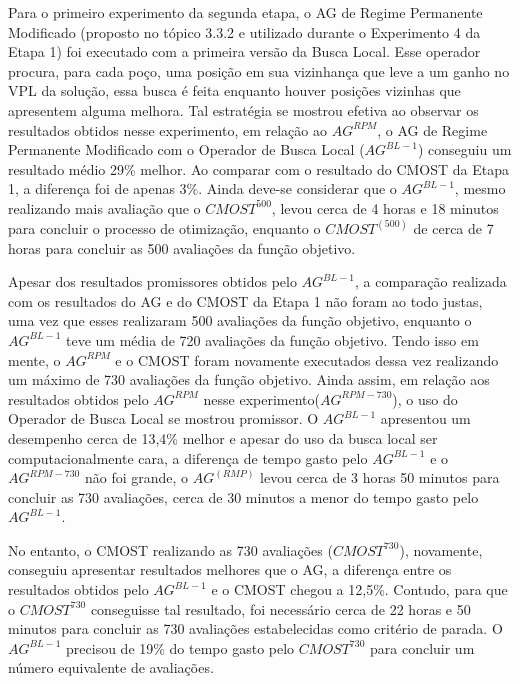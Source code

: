 Para o primeiro experimento da segunda etapa, o AG de Regime Permanente Modificado (proposto no tópico 3.3.2 e utilizado durante o Experimento 4 da Etapa 1) foi executado com a primeira versão da Busca Local. Esse operador procura, para cada poço, uma posição em sua vizinhança que leve a um ganho no VPL da solução, essa busca é feita enquanto houver posições vizinhas que apresentem alguma melhora. Tal estratégia se mostrou efetiva ao observar os resultados obtidos nesse experimento, em relação ao $AG^{RPM}$, o AG de Regime Permanente Modificado com o Operador de Busca Local ($AG^{BL-1}$) conseguiu um resultado médio 29\% melhor. Ao comparar com o resultado do CMOST da Etapa 1, a diferença foi de apenas 3\%. Ainda deve-se considerar que o $AG^{BL-1}$, mesmo realizando mais avaliação que o $CMOST^{500}$, levou cerca de 4 horas e 18 minutos para concluir o processo de otimização, enquanto o $CMOST^(500)$ de cerca de 7 horas para concluir as 500 avaliações da função objetivo.

Apesar dos resultados promissores obtidos pelo $AG^{BL-1}$, a comparação realizada com os resultados do AG e do CMOST da Etapa 1 não foram ao todo justas, uma vez que esses realizaram 500 avaliações da função objetivo, enquanto o $AG^{BL-1}$ teve um média de 720 avaliações da função objetivo. Tendo isso em mente, o $AG^{RPM}$ e o CMOST foram novamente executados dessa vez realizando um máximo de 730 avaliações da função objetivo. Ainda assim, em relação aos resultados obtidos pelo $AG^{RPM}$ nesse experimento($AG^{RPM-730}$), o uso do Operador de Busca Local se mostrou promissor. O $AG^{BL-1}$ apresentou um desempenho cerca de 13,4\% melhor e apesar do uso da busca local ser computacionalmente cara, a diferença de tempo gasto pelo $AG^{BL-1}$ e o $AG^{RPM-730}$ não foi grande, o $AG^(RMP)$ levou cerca de 3 horas 50 minutos para concluir as 730 avaliações, cerca de 30 minutos a menor do tempo gasto pelo $AG^{BL-1}$.

No entanto, o CMOST realizando as 730 avaliações ($CMOST^{730}$), novamente, conseguiu apresentar resultados melhores que o AG, a diferença entre os resultados obtidos pelo $AG^{BL-1}$ e o CMOST chegou a 12,5\%. Contudo, para que o $CMOST^{730}$ conseguisse tal resultado, foi necessário cerca de 22 horas e 50 minutos para concluir as 730 avaliações estabelecidas como critério de parada. O $AG^{BL-1}$ precisou de 19\% do tempo gasto pelo $CMOST^{730}$ para concluir um número equivalente de avaliações.

